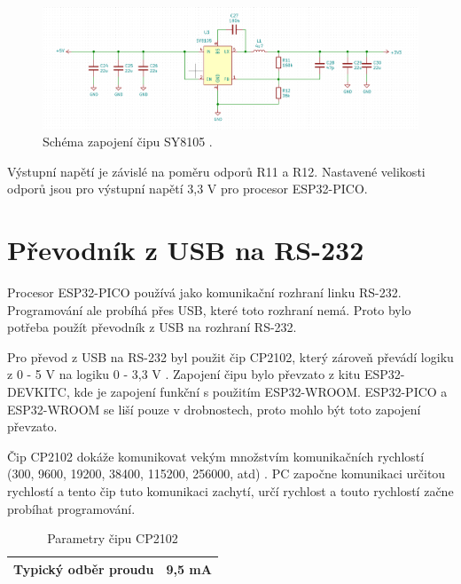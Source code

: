   \begin{figure}[!h]
    \begin{center}
      \includegraphics[scale=0.4]{obrazky/SY8105_schema.png}
    \end{center}
    \caption[Schéma zapojení čipu SY8105]{Schéma zapojení čipu SY8105 \cite{SY8105_datasheet}.}
  \end{figure}

  Výstupní napětí je závislé na poměru odporů R11 a R12. Nastavené velikosti odporů jsou pro výstupní napětí 3,3 V pro procesor 
  ESP32-PICO.

  \section{Převodník z USB na RS-232}
  Procesor ESP32-PICO používá jako komunikační rozhraní linku RS-232. Programování ale probíhá přes USB, které toto rozhraní
  nemá. Proto bylo potřeba použít převodník z USB na rozhraní RS-232.
  
  Pro převod z USB na RS-232 byl použit čip CP2102, který  zároveň převádí logiku z 0 - 5 V na logiku 0 - 3,3 V 
  \cite{CP2102_datasheet}. Zapojení čipu bylo převzato z kitu ESP32-DEVKITC, kde je zapojení funkční s použitím ESP32-WROOM.
  ESP32-PICO a ESP32-WROOM se liší pouze v drobnostech, proto mohlo být toto zapojení převzato.

  Čip CP2102 dokáže komunikovat vekým množstvím komunikačních rychlostí (300, 9600, 19200, 38400, 115200, 256000, atd) 
  \cite{CP2102_datasheet}. PC započne komunikaci určitou rychlostí a tento čip tuto komunikaci zachytí, určí rychlost 
  a touto rychlostí začne probíhat programování.
  \begin{table}[!h]
    \caption{Parametry čipu CP2102 \cite{CP2102_datasheet}}
    \begin{center}
        \begin{tabular}{|c|c|}
            \hline
            Typický odběr proudu   & 9,5 mA \\
            \hline
        \end{tabular}    
    \end{center}
\end{table}


